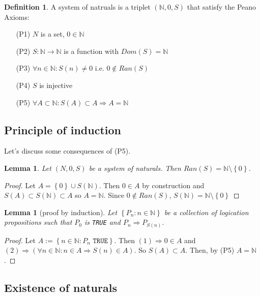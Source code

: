 \documentclass{article}
\newcommand\N{\ensuremath{\mathbb{N}}}
\newtheorem{lemma}[theorem]{Lemma}
\theoremstyle{definition}
\newtheorem{definition}{Definition}[subsection]
\theoremstyle{remark}
\theoremstyle{plain}
\begin{document}
\begin{definition}
    A system of natruals is a triplet \((\N, 0, S)\) that satisfy the Peano Axioms:
    \begin{enumerate}
        \item[(P1)] \(N\) is a set, \(0 \in \N\)
        \item[(P2)] \(S: \N \to \N\) is a function with \(Dom(S) = \N\)
        \item[(P3)] \(\forall n \in  \N: S(n) \neq 0\) i.e. \(0 \notin Ran(S)\)
        \item[(P4)] \(S\) is injective
        \item[(P5)] \(\forall A \subset \N: S(A) \subset A \Rightarrow A = \N\) 
    \end{enumerate}
\end{definition}

\subsection{Principle of induction}

Let's discuss some consequences of (P5).

\begin{lemma}
    Let \((N, 0, S)\) be a system of naturals. Then \(Ran(S) = \N\setminus \left\{ 0 \right\}\).
\end{lemma}
\begin{proof}
    Let \(A = \left\{ 0 \right\}\cup S(\N)\). Then \(0\in A\) by construction and \(S(A) \subset S(\N) \subset A\) so \(A = \N\). 
    Since \(0 \notin Ran(S)\), \(S(\N) = \N\setminus \left\{ 0 \right\}\)
\end{proof}

\begin{lemma}[proof by induction]
    Let \(\left\{ P_n: n\in \N \right\}\) be a collection of logication propositions such that \(P_0\) is \texttt{TRUE} and \(P_n \Rightarrow P_{S(n)}\).
\end{lemma}
\begin{proof}
    Let \(A:= \left\{ n \in \N : P_n \texttt{ TRUE} \right\}\). Then \((1) \Rightarrow 0 \in A\) and \((2) \Rightarrow (\forall n\in \N: n\in A \Rightarrow S(n) \in A)\). So \(S(A)\subset A\). Then, by (P5) \(A = \N\).
\end{proof}

\subsection{Existence of naturals}
\end{document}
